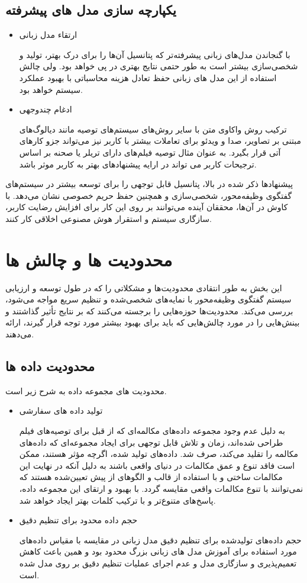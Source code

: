 \subsection{یکپارچه سازی مدل های پیشرفته}
\begin{itemize}
\item
ارتقاء مدل زبانی

با گنجاندن مدل‌های زبانی پیشرفته‌تر که پتانسیل آن‌ها را برای درک بهتر، تولید و شخصی‌سازی بیشتر است به طور حتمی نتایج بهتری در پی خواهد بود. ولی چالش استفاده از این مدل های زبانی حفظ تعادل هزینه محاسباتی با بهبود عملکرد سیستم خواهد بود.
\item
ادغام چندوجهی

ترکیب روش واکاوی متن با سایر روش‌های سیستم‌های توصیه مانند دیالوگ‌های مبتنی بر تصاویر، صدا و ویدئو برای تعاملات بیشتر با کاربر نیز می‌تواند جزو کارهای آتی قرار بگیرد. به عنوان مثال توصیه فیلم‌های دارای تریلر یا صحنه بر اساس ترجیحات کاربر می تواند در ارایه پیشنهادهای بهتر به کاربر موثر باشد.
\end{itemize}

پیشنهادها ذکر شده در بالا، پتانسیل قابل توجهی را برای توسعه بیشتر در سیستم‌های گفتگوی وظیفه‌محور، شخصی‌سازی و همچنین حفظ حریم خصوصی نشان می‌دهد. با کاوش در آن‌ها، محققان آینده می‌توانند بر روی این کار برای افزایش رضایت کاربر، سازگاری سیستم و استقرار هوش مصنوعی اخلاقی کار کنند.


\section{محدودیت ها و چالش ها}

این بخش به طور انتقادی محدودیت‌ها و مشکلاتی را که در طول توسعه و ارزیابی سیستم گفتگوی وظیفه‌محور با نمایه‌های شخصی‌شده و تنظیم سریع مواجه می‌شود، بررسی می‌کند. محدودیت‌ها حوزه‌هایی را برجسته می‌کنند که بر نتایج تأثیر گذاشتند و بینش‌هایی را در مورد چالش‌هایی که باید برای بهبود بیشتر مورد توجه قرار گیرند، ارائه می‌دهند.

\subsection{محدودیت داده ها}
محدودیت های مجموعه داده به شرح زیر است.
\begin{itemize}
\item
 تولید داده های سفارشی

به دلیل عدم وجود مجموعه داده‌های مکالمه‌ای که از قبل برای توصیه‌های فیلم طراحی شده‌اند، زمان و تلاش قابل توجهی برای ایجاد مجموعه‌ای که داده‌های مکالمه را تقلید می‌کند، صرف شد. داده‌های تولید شده، اگرچه مؤثر هستند، ممکن است فاقد تنوع و عمق مکالمات در دنیای واقعی باشند به دلیل آنکه در نهایت این مکالمات ساختی و با استفاده از قالب و الگوهای از پیش تعیین‌شده هستند که نمی‌توانند با تنوع مکالمات واقعی مقایسه گردد. با بهبود و ارتقای این مجموعه داده، پاسخ‌های متنوع‌تر و با ترکیب کلمات بهتر ایجاد خواهد شد.

\item
 حجم داده محدود برای تنظیم دقیق

حجم داده‌های تولیدشده برای تنظیم دقیق مدل زبانی در مقایسه با مقیاس داده‌های مورد استفاده برای آموزش مدل های زبانی بزرگ محدود بود و همین باعث کاهش تعمیم‌پذیری و سازگاری مدل و عدم اجرای عملیات تنظیم دقیق بر روی مدل شده است.
\end{itemize}

